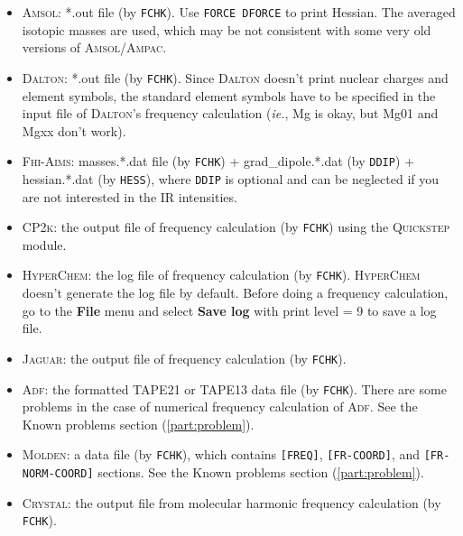 \documentclass[12pt,english]{extarticle}
\begin{document}
\begin{itemize}
\item \textsc{Amsol}: *.out file (by \verb|FCHK|). Use \texttt{FORCE DFORCE} to print
Hessian. The averaged isotopic masses are used, which may be not
consistent with some very old versions of \textsc{Amsol/Ampac}.
\item \textsc{Dalton}: *.out file (by \verb|FCHK|). Since \textsc{Dalton} doesn't print nuclear
charges and element symbols, the standard element symbols have to be
specified in the input file of \textsc{Dalton}'s frequency calculation (\emph{ie.}, Mg is
okay, but Mg01 and Mgxx don't work).
\item \textsc{Fhi-Aims}: masses.*.dat file (by \verb|FCHK|) + grad{\_}dipole.*.dat (by
\verb|DDIP|) + hessian.*.dat (by \verb|HESS|), where \verb|DDIP| is
optional and can be neglected if you are not interested in the IR
intensities.
\item \textsc{CP2k}: the output file of frequency calculation (by \verb|FCHK|) using the
\textsc{Quickstep} module.
\item \textsc{HyperChem}: the log file of frequency calculation (by \verb|FCHK|).
\textsc{HyperChem} doesn't generate the log file by default. Before doing a frequency
calculation, go to the \textbf{File} menu and select \textbf{Save log} with print level = 9 to save a
log file.
\item \textsc{Jaguar}: the output file of frequency calculation (by \verb|FCHK|).
\item \textsc{Adf}: the formatted TAPE21 or TAPE13 data file (by \verb|FCHK|). There are
some problems in the case of numerical frequency calculation of \textsc{Adf}. See the
Known problems section (\ref{part:problem}).
\item \textsc{Molden}: a data file (by \verb|FCHK|), which contains \verb|[FREQ]|,
\verb|[FR-COORD]|, and \verb|[FR-NORM-COORD]| sections.
See the Known problems section (\ref{part:problem}).
\item \textsc{Crystal}: the output file from molecular harmonic frequency calculation (by \verb|FCHK|).

\end{itemize}
\end{document}
